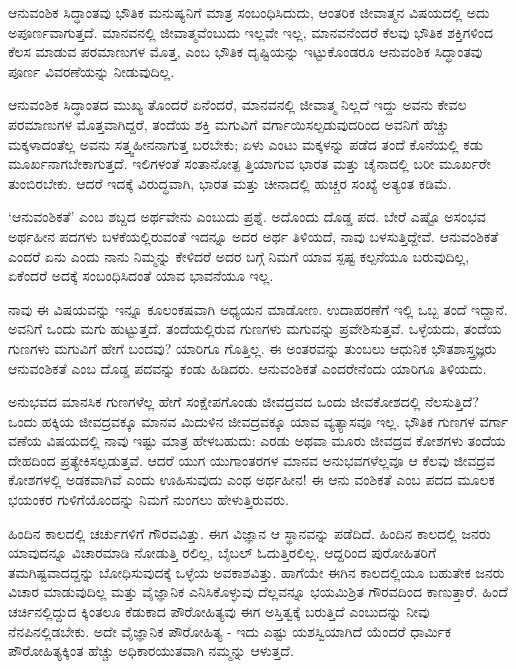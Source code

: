 ಆನುವಂಶಿಕ ಸಿದ್ಧಾಂತವು ಭೌತಿಕ ಮನುಷ್ಯನಿಗೆ ಮಾತ್ರ ಸಂಬಂಧಿಸಿದುದು, ಆಂತರಿಕ ಜೀವಾತ್ಮನ ವಿಷಯದಲ್ಲಿ ಅದು ಅಪೂರ್ಣವಾಗುತ್ತದೆ. ಮಾನವನಲ್ಲಿ ಜೀವಾತ್ಮವೆಂಬುದು ಇಲ್ಲವೇ ಇಲ್ಲ, ಮಾನವನೆಂದರೆ ಕೆಲವು ಭೌತಿಕ ಶಕ್ತಿಗಳಿಂದ ಕೆಲಸ ಮಾಡುವ ಪರಮಾಣುಗಳ ಮೊತ್ತ, ಎಂಬ ಭೌತಿಕ ದೃಷ್ಟಿಯನ್ನು ಇಟ್ಟುಕೊಂಡರೂ ಆನುವಂಶಿಕ ಸಿದ್ಧಾಂತವು ಪೂರ್ಣ ವಿವರಣೆಯನ್ನು ನೀಡುವುದಿಲ್ಲ.

ಆನುವಂಶಿಕ ಸಿದ್ಧಾಂತದ ಮುಖ್ಯ ತೊಂದರೆ ಏನೆಂದರೆ, ಮಾನವನಲ್ಲಿ ಜೀವಾತ್ಮ ನಿಲ್ಲದೆ ಇದ್ದು ಅವನು ಕೇವಲ ಪರಮಾಣುಗಳ ಮೊತ್ತವಾಗಿದ್ದರೆ, ತಂದೆಯ ಶಕ್ತಿ ಮಗುವಿಗೆ ವರ್ಗಾಯಿಸಲ್ಪಡುವುದರಿಂದ ಅವನಿಗೆ ಹೆಚ್ಚು ಮಕ್ಕಳಾದಂತೆಲ್ಲ ಅವನು ಸತ್ತ್ವಹೀನನಾಗುತ್ತ ಬರಬೇಕು; ಏಳು ಎಂಟು ಮಕ್ಕಳನ್ನು ಪಡೆದ ತಂದೆ ಕೊನೆಯಲ್ಲಿ ಕಡು ಮೂರ್ಖನಾಗಬೇಕಾಗುತ್ತದೆ. ಇಲಿಗಳಂತೆ ಸಂತಾನೋತ್ಪ ತ್ತಿಯಾಗುವ ಭಾರತ ಮತ್ತು ಚೈನಾದಲ್ಲಿ ಬರೀ ಮೂರ್ಖರೇ ತುಂಬಿರಬೇಕು. ಆದರೆ ಇದಕ್ಕೆ ವಿರುದ್ಧವಾಗಿ, ಭಾರತ ಮತ್ತು ಚೀನಾದಲ್ಲಿ ಹುಚ್ಚರ ಸಂಖ್ಯೆ ಅತ್ಯಂತ ಕಡಿಮೆ.

‘ಆನುವಂಶಿಕತೆ’ ಎಂಬ ಶಬ್ದದ ಅರ್ಥವೇನು ಎಂಬುದು ಪ್ರಶ್ನೆ. ಅದೊಂದು ದೊಡ್ಡ ಪದ. ಬೇರೆ ಎಷ್ಟೊ ಅಸಂಭವ ಅರ್ಥಹೀನ ಪದಗಳು ಬಳಕೆಯಲ್ಲಿರುವಂತೆ ಇದನ್ನೂ ಅದರ ಅರ್ಥ ತಿಳಿಯದೆ, ನಾವು ಬಳಸುತ್ತಿದ್ದೇವೆ. ಆನುವಂಶಿಕತೆ ಎಂದರೆ ಏನು ಎಂದು ನಾನು ನಿಮ್ಮನ್ನು ಕೇಳಿದರೆ ಅದರ ಬಗ್ಗೆ ನಿಮಗೆ ಯಾವ ಸ್ಪಷ್ಟ ಕಲ್ಪನೆಯೂ ಬರುವುದಿಲ್ಲ, ಏಕೆಂದರೆ ಅದಕ್ಕೆ ಸಂಬಂಧಿಸಿದಂತೆ ಯಾವ ಭಾವನೆಯೂ ಇಲ್ಲ.

ನಾವು ಈ ವಿಷಯವನ್ನು ಇನ್ನೂ ಕೂಲಂಕಷವಾಗಿ ಅಧ್ಯಯನ ಮಾಡೋಣ. ಉದಾಹರಣೆಗೆ ಇಲ್ಲಿ ಒಬ್ಬ ತಂದೆ ಇದ್ದಾನೆ. ಅವನಿಗೆ ಒಂದು ಮಗು ಹುಟ್ಟುತ್ತದೆ. ತಂದೆಯಲ್ಲಿರುವ ಗುಣಗಳು ಮಗುವನ್ನು ಪ್ರವೇಶಿಸುತ್ತವೆ. ಒಳ್ಳೆಯದು, ತಂದೆಯ ಗುಣಗಳು ಮಗುವಿಗೆ ಹೇಗೆ ಬಂದವು? ಯಾರಿಗೂ ಗೊತ್ತಿಲ್ಲ. ಈ ಅಂತರವನ್ನು ತುಂಬಲು ಆಧುನಿಕ ಭೌತಶಾಸ್ತ್ರಜ್ಞರು ಆನುವಂಶಿಕತೆ ಎಂಬ ದೊಡ್ಡ ಪದವನ್ನು ಕಂಡು ಹಿಡಿದರು. ಆನುವಂಶಿಕತೆ ಎಂದರೇನೆಂದು ಯಾರಿಗೂ ತಿಳಿಯದು.

ಅನುಭವದ ಮಾನಸಿಕ ಗುಣಗಳೆಲ್ಲ ಹೇಗೆ ಸಂಕ್ಷೇಪಗೊಂಡು ಜೀವದ್ರವದ ಒಂದು ಜೀವಕೋಶದಲ್ಲಿ ನೆಲಸುತ್ತಿದೆ? ಒಂದು ಹಕ್ಕಿಯ ಜೀವದ್ರವಕ್ಕೂ ಮಾನವ ಮಿದುಳಿನ ಜೀವದ್ರವಕ್ಕೂ ಯಾವ ವ್ಯತ್ಯಾಸವೂ ಇಲ್ಲ. ಭೌತಿಕ ಗುಣಗಳ ವರ್ಗಾ ವಣೆಯ ವಿಷಯದಲ್ಲಿ ನಾವು ಇಷ್ಟು ಮಾತ್ರ ಹೇಳಬಹುದು: ಎರಡು ಅಥವಾ ಮೂರು ಜೀವದ್ರವ ಕೋಶಗಳು ತಂದೆಯ ದೇಹದಿಂದ ಪ್ರತ್ಯೇಕಿಸಲ್ಪಡುತ್ತವೆ. ಆದರೆ ಯುಗ ಯುಗಾಂತರಗಳ ಮಾನವ ಅನುಭವಗಳೆಲ್ಲವೂ ಆ ಕೆಲವು ಜೀವದ್ರವ ಕೋಶಗಳಲ್ಲಿ ಅಡಕವಾಗಿವೆ ಎಂದು ಊಹಿಸುವುದು ಎಂಥ ಅರ್ಥಹೀನ! ಈ ಆನು ವಂಶಿಕತೆ ಎಂಬ ಪದದ ಮೂಲಕ ಭಯಂಕರ ಗುಳಿಗೆಯೊಂದನ್ನು ನಿಮಗೆ ನುಂಗಲು ಹೇಳುತ್ತಿರುವರು.

ಹಿಂದಿನ ಕಾಲದಲ್ಲಿ ಚರ್ಚುಗಳಿಗೆ ಗೌರವವಿತ್ತು. ಈಗ ವಿಜ್ಞಾನ ಆ ಸ್ಥಾನವನ್ನು ಪಡೆದಿದೆ. ಹಿಂದಿನ ಕಾಲದಲ್ಲಿ ಜನರು ಯಾವುದನ್ನೂ ವಿಚಾರಮಾಡಿ ನೋಡುತ್ತಿ ರಲಿಲ್ಲ, ಬೈಬಲ್ ಓದುತ್ತಿರಲಿಲ್ಲ. ಆದ್ದರಿಂದ ಪುರೋಹಿತರಿಗೆ ತಮಗಿಷ್ಟವಾದದ್ದನ್ನು ಬೋಧಿಸುವುದಕ್ಕೆ ಒಳ್ಳೆಯ ಅವಕಾಶವಿತ್ತು. ಹಾಗೆಯೇ ಈಗಿನ ಕಾಲದಲ್ಲಿಯೂ ಬಹುತೇಕ ಜನರು ವಿಚಾರ ಮಾಡುವುದಿಲ್ಲ ಮತ್ತು ವೈಜ್ಞಾನಿಕ ಎನಿಸಿಕೊಳ್ಳುವು ದೆಲ್ಲವನ್ನೂ ಭಯಮಿಶ್ರಿತ ಗೌರವದಿಂದ ಕಾಣುತ್ತಾರೆ. ಹಿಂದೆ ಚರ್ಚಿನಲ್ಲಿದ್ದುದ ಕ್ಕಿಂತಲೂ ಕೆಡುಕಾದ ಪೌರೋಹಿತ್ಯವು ಈಗ ಅಸ್ತಿತ್ವಕ್ಕೆ ಬರುತ್ತಿದೆ ಎಂಬುದನ್ನು ನೀವು ನೆನಪಿನಲ್ಲಿಡಬೇಕು. ಅದೇ ವೈಜ್ಞಾನಿಕ ಪೌರೋಹಿತ್ಯ - ಇದು ಎಷ್ಟು ಯಶಸ್ವಿಯಾಗಿದೆ ಯೆಂದರೆ ಧಾರ್ಮಿಕ ಪೌರೋಹಿತ್ಯಕ್ಕಿಂತ ಹೆಚ್ಚು ಅಧಿಕಾರಯುತವಾಗಿ ನಮ್ಮನ್ನು ಆಳುತ್ತದೆ.

